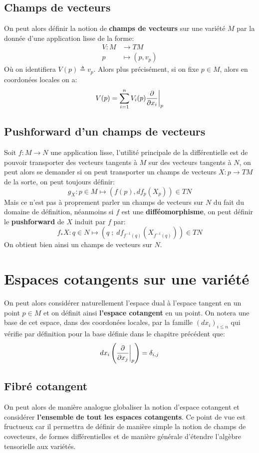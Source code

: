 \section{Champs de vecteurs}
On peut alors définir la notion de \textbf{champs de vecteurs} sur une variété \( M \) par la donnée d'une application lisse de la forme:
\[ 
   \begin{aligned}
      V : M &\longrightarrow TM \\
      p &\longmapsto (p, v_p)
   \end{aligned} 
\]
Où on identifiera \( V(p) \triangleq v_p \). Alors plus précisément, si on fixe \( p \in M \), alors en coordonées locales on a:
\[ 
   V(p) = \sum_{i = 1}^n V_i(p) \frac{\partial }{\partial x_i}\biggr|_p
\]
\pagebreak
\section{Pushforward d'un champs de vecteurs}
Soit \( f : M \longrightarrow N \) une application lisse, l'utilité principale de la différentielle est de pouvoir transporter des vecteurs tangents à \( M \) sur des vecteurs tangents à \( N \), on peut alors se demander si on peut transporter un champs de vecteurs \( X : p \longrightarrow TM \) de la sorte, on peut toujours définir:
\[ 
   g_X : p \in M \longmapsto (f(p), df_p(X_p)) \in TN
\]
Mais ce n'est pas à proprement parler un champs de vecteurs sur \( N \) du fait du domaine de définition, néanmoins si \( f \) est une \textbf{difféomorphisme}, on peut définir le \textbf{pushforward} de \( X \) induit par \( f \) par:
\[ 
   f_*X : q \in N \longmapsto (q \; ; \; df_{f^{-1}(q)}(X_{f^{-1}(q)})) \in TN
\]
On obtient bien ainsi un champs de vecteurs sur \( N \).

\chapter{Espaces cotangents sur une variété}
On peut alors considérer naturellement l'espace dual à l'espace tangent en un point \( p \in M \) et on définit ainsi \textbf{l'espace cotangent} en un point. On notera une base de cet espace, dans des coordonées locales, par la famille \( (dx_i)_{i \leq n} \) qui vérifie par définition pour la base définie dans le chapitre précédent que:
\[ 
   dx_i\left(\frac{\partial }{\partial x_j}\biggr|_p\right) = \delta_{i, j}
\]
\section{Fibré cotangent}
On peut alors de manière analogue globaliser la notion d'espace cotangent et considérer \textbf{l'ensemble de tout les espaces cotangents}. Ce point de vue est fructueux car il permettra de définir de manière simple la notion de champs de covecteurs, de formes différentielles et de manière générale d'étendre l'algèbre tensorielle aux variétés.\< 

